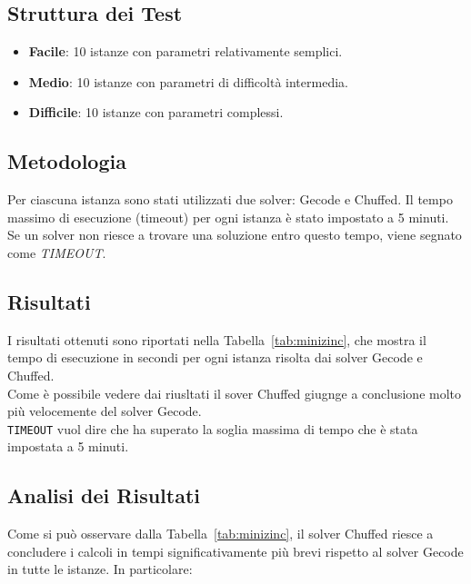 \documentclass{article}
\begin{document}
\begin{multicols*}{2}
\subsection{Struttura dei Test}

\begin{itemize}
    \item \textbf{Facile}: 10 istanze con parametri relativamente semplici.
    \item \textbf{Medio}: 10 istanze con parametri di difficoltà intermedia.
    \item \textbf{Difficile}: 10 istanze con parametri complessi.
\end{itemize}

\subsection{Metodologia}

Per ciascuna istanza sono stati utilizzati due solver: Gecode e Chuffed. 
Il tempo massimo di esecuzione (timeout) per ogni istanza è stato impostato a 5 minuti. 
Se un solver non riesce a trovare una soluzione entro questo tempo, viene segnato come \textit{TIMEOUT}.

\subsection{Risultati}
I risultati ottenuti sono riportati nella Tabella~\ref{tab:minizinc}, 
che mostra il tempo di esecuzione in secondi per ogni istanza risolta dai solver Gecode e Chuffed.
\\
Come è possibile vedere dai riusltati il sover Chuffed giugnge a conclusione molto più velocemente del solver Gecode.
\\
\texttt{TIMEOUT} vuol dire che ha superato la soglia massima di tempo che è stata impostata a 5 minuti.

\subsection{Analisi dei Risultati}
Come si può osservare dalla Tabella~\ref{tab:minizinc}, 
il solver Chuffed riesce a concludere i calcoli in tempi significativamente più brevi rispetto al solver Gecode in tutte le istanze. 
In particolare:


\end{multicols*}
\end{document}
